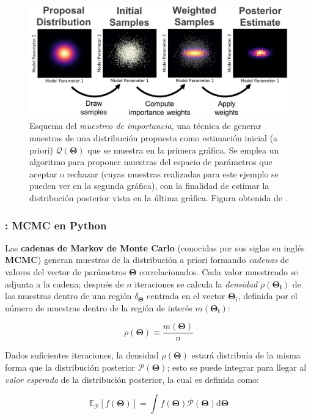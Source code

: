\begin{figure}[!ht]
	\centering
	\includegraphics[scale=0.28]{Introduccion/Figures/Figura MCMC Pesos Muestreo.png}
	\caption{Esquema del \textit{muestreo de importancia}, una técnica de
	generar muestras de una distribución propuesta como estimación inicial (a
	priori) $\mathcal{Q}(\mathbf{\Theta})$ que se muestra en la primera gráfica.
	Se emplea un algoritmo para proponer muestras del espacio de parámetros que
	aceptar o rechazar (cuyas muestras realizadas para este ejemplo se pueden
	ver en la segunda gráfica), con la finalidad de estimar la distribución
	posterior vista en la última gráfica. Figura obtenida de
	.}
	\label{figuraMcmcMuestreoImportancia}
\end{figure}

\subsubsection{: MCMC en Python}

Las \textbf{cadenas de Markov de Monte Carlo} (conocidas por sus siglas en
inglés \textbf{MCMC}) generan muestras de la distribución a priori formando
\textit{cadenas} de valores del vector de parámetros $\mathbf{\Theta}$
correlacionados. Cada valor muestreado se adjunta a la cadena; después de $n$
iteraciones se calcula la \textit{densidad} $\rho(\mathbf{\Theta_i})$ de las
muestras dentro de una región $\delta_{\mathbf{\Theta}}$ centrada en el vector
$\mathbf{\Theta}_i$, definida por el número de muestras dentro de la región de
interés $m(\mathbf{\Theta_i})$:

\begin{eqfloat}[!ht]
	\centering
	\begin{equation}
		\rho(\mathbf{\Theta}) \equiv \frac{m(\mathbf{\Theta})}{n}
	\end{equation}
\end{eqfloat}

Dados suficientes iteraciones, la densidad $\rho(\mathbf{\Theta})$ estará
distribuía de la misma forma que la distribución posterior
$\mathcal{P}(\mathbf{\Theta})$; esto se puede integrar para llegar al
\textit{valor esperado} de la distribución posterior, la cual es definida como:

\begin{eqfloat}[!ht]
	\centering
	\begin{equation}
		\mathbb{E}_{\mathcal{P}}\left[f(\mathbf{\Theta})\right] = \int{f(\mathbf{\Theta}) \mathcal{P}(\mathbf{\Theta}) \textrm{d}\mathbf{\Theta}}
	\end{equation}
\end{eqfloat}

